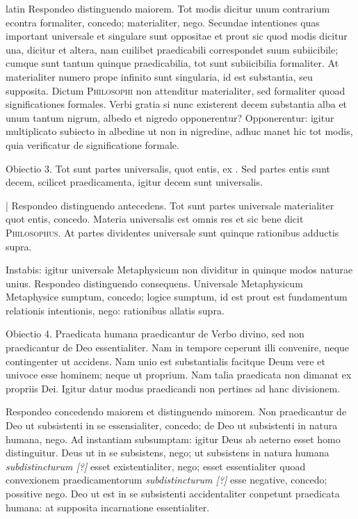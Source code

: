 \begin{otherlanguage*}{latin}
\pstart
  Respondeo distinguendo maiorem. Tot modis dicitur unum contrarium econtra formaliter, concedo; materialiter, nego. Secundae intentiones quas important universale et singulare sunt oppositae et prout sic quod modis dicitur una, dicitur et altera, nam cuilibet praedicabili correspondet suum subiicibile; cumque sunt tantum quinque praedicabilia, tot sunt subiicibilia formaliter. At materialiter numero prope infinito sunt singularia, id est substantia, seu supposita. Dictum \textsc{Philosophi} non attenditur materialiter, sed formaliter quoad significationes formales. Verbi gratia si nunc existerent decem substantia alba et unum tantum nigrum, albedo et nigredo opponerentur? Opponerentur: igitur multiplicato subiecto in albedine ut non in nigredine, adhuc manet hic tot modis, quia verificatur de significatione formale. 
\pend

\pstart
  Obiectio 3. Tot sunt partes universalis, quot entis, ex . Sed partes entis sunt decem, scilicet praedicamenta, igitur decem sunt universalis. 
\pend

\pstart
  \textnormal{|}   Respondeo distinguendo antecedens. Tot sunt partes universale materialiter quot entis, concedo. Materia universalis est omnis res et sic bene dicit \textsc{Philosophus}. At partes dividentes universale sunt quinque rationibus adductis supra. 
\pend

\pstart
  Instabis: igitur universale Metaphysicum non dividitur in quinque modos naturae unius. Respondeo distinguendo consequens. Universale Metaphysicum Metaphysice sumptum, concedo; logice sumptum, id est prout est fundamentum relationis intentionis, nego: rationibus allatis supra. 
\pend

\pstart
  Obiectio 4. Praedicata humana praedicantur de Verbo divino, sed non praedicantur de Deo essentialiter. Nam in tempore ceperunt illi convenire, neque contingenter ut accidens. Nam unio est substantialis facitque Deum vere et univoce esse hominem; neque ut proprium. Nam talia praedicata non dimanat ex propriis Dei. Igitur datur modus praedicandi non pertines ad hanc divisionem. 
\pend

\pstart
  Respondeo concedendo maiorem et distinguendo minorem. Non praedicantur de Deo ut subsistenti in se essensialiter, concedo; de Deo ut subsistenti in natura humana, nego. Ad instantiam subsumptam: igitur Deus ab aeterno esset homo distinguitur. Deus ut in se subsistens, nego; ut subsistens in natura humana \emph{subdistincturum [?]} esset existentialiter, nego; esset essentialiter quoad convexionem praedicamentorum \emph{subdistincturum [?]} esse negative, concedo; possitive nego. Deo ut est in se subsistenti accidentaliter conpetunt praedicata humana: at supposita incarnatione essentialiter. 
\pend


\end{otherlanguage*}
